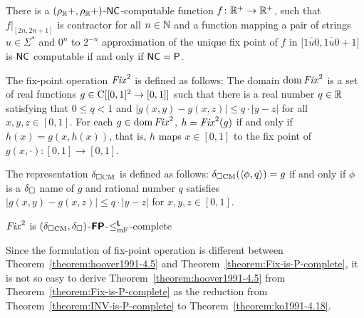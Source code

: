 \documentclass[envcountsame,orivec,oribibl]{llncs}
\begin{document}
\begin{theorem}
\label{theorem:hoover1991-4.5}
 There is a $(\rho _\mathbb R+, \rho _\mathbb R+)$-$\mathsf{NC}$-computable function $f \colon \mathbb R^+ \to \mathbb R^+$,
 such that $f|_{[2n, 2n+1]}$ is contractor for all $n \in \mathbb N$ and
 a function mapping a pair of strings $u \in \Sigma^*$ and $0^n$
 to $2^{-n}$ approximation of the unique fix point of $f$
 in $\bigl[ \overline{1u0}, \overline{1u0}+1 \bigr]$ is $\mathsf{NC}$ computable
 if and only if $\mathsf{NC} = \mathsf{P}$.
\end{theorem}

The fix-point operation $\mathit{Fix}^2$ is defined as follows:
The domain $\mathop{\rm dom} \mathit{Fix}^2$ is a set of real functions 
$g \in \mathrm C[[0,1]^2 \to [0,1]]$ such that there is a real number $q \in \mathbb R$
satisfying that $0 \le q < 1$ and $|g(x, y) - g(x, z)| \le q \cdot |y - z|$
for all $x, y, z \in [0,1]$.
For each $g \in \mathop{\rm dom} \mathit{Fix}^2$, $h = \mathit{Fix}^2(g)$ if and only if 
$h(x) = g(x, h(x))$, that is, $h$ maps $x \in [0,1]$ to the fix point of $g(x, \cdot) \colon [0,1] \to [0,1]$.

The representation $\delta _{\square \mathrm{CM}}$ is defined as follows:
$\delta _{\square \mathrm{CM}}(\langle \phi, q \rangle) = g$ if and only if
$\phi$ is a $\delta _\square$ name of $g$ and rational number $q$ satisfies 
$|g(x, y) - g(x, z)| \le q \cdot |y - z|$ for  $x, y, z \in [0,1]$.

\begin{theorem}
 \label{theorem:Fix-is-P-complete}
 $\mathit{Fix}^2$ is $(\delta _{\square \mathrm{CM}}, \delta _\square)$-$\text{\bfseries \sffamily \upshape FP}$-$\leq _{\mathrm{mF}} ^{\text{\bfseries \sffamily \upshape L}}$-complete
\end{theorem}


Since the formulation of fix-point operation is different between 
Theorem~\ref{theorem:hoover1991-4.5} and Theorem~\ref{theorem:Fix-is-P-complete},
it is not so easy to derive Theorem~\ref{theorem:hoover1991-4.5} from
Theorem~\ref{theorem:Fix-is-P-complete} as the reduction from 
Theorem~\ref{theorem:INV-is-P-complete} to Theorem~\ref{theorem:ko1991-4.18}.
\end{document}

